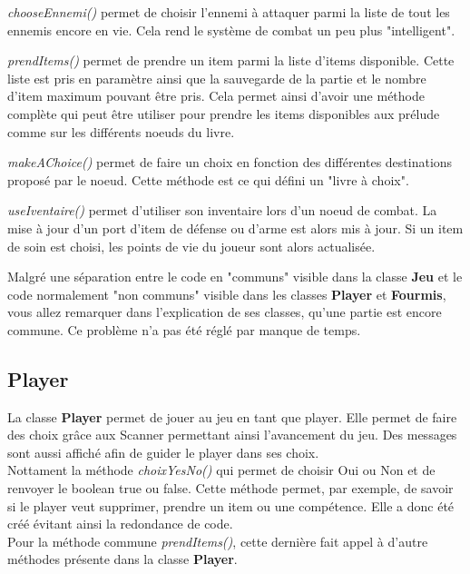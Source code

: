 		\textit{chooseEnnemi()} permet de choisir l'ennemi à attaquer parmi la liste de tout les ennemis encore en vie. Cela rend le système de combat un peu plus "intelligent".

		\textit{prendItems()} permet de prendre un item parmi la liste d'items disponible. Cette liste est pris en paramètre ainsi que la sauvegarde de la partie et le nombre d'item maximum pouvant être pris. Cela permet ainsi d'avoir une méthode complète qui peut être utiliser pour prendre les items disponibles aux prélude comme sur les différents noeuds du livre.

		\textit{makeAChoice()} permet de faire un choix en fonction des différentes destinations proposé par le noeud. Cette méthode est ce qui défini un "livre à choix".

		\textit{useIventaire()} permet d'utiliser son inventaire lors d'un noeud de combat. La mise à jour d'un port d'item de défense ou d'arme est alors mis à jour. Si un item de soin est choisi, les points de vie du joueur sont alors actualisée.

		Malgré une séparation entre le code en "communs" visible dans la classe \textbf{Jeu} et le code normalement "non communs" visible dans les classes \textbf{Player} et \textbf{Fourmis}, vous allez remarquer dans l'explication de ses classes, qu'une partie est encore commune. Ce problème n'a pas été réglé par manque de temps.

	\subsection{Player}\label{sub:player}
		La classe \textbf{Player} permet de jouer au jeu en tant que player. Elle permet de faire des choix grâce aux Scanner permettant ainsi l'avancement du jeu. Des messages sont aussi affiché afin de guider le player dans ses choix.\\
		Nottament la méthode \textit{choixYesNo()} qui permet de choisir Oui ou Non et de renvoyer le boolean true ou false. Cette méthode permet, par exemple, de savoir si le player veut supprimer, prendre un item ou une compétence. Elle a donc été créé évitant ainsi la redondance de code.\\

		Pour la méthode commune \textit{prendItems()}, cette dernière fait appel à d'autre méthodes présente dans la classe \textbf{Player}.

